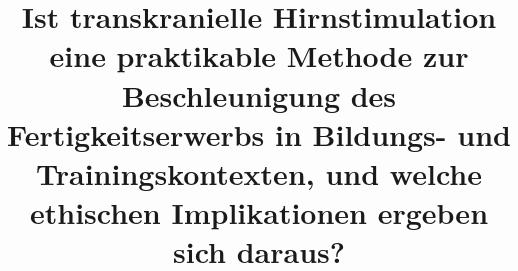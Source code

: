 
\newcommand{\waterMarkText}{}

\createdon{\today}

\title{Ist transkranielle Hirnstimulation eine praktikable Methode zur Beschleunigung des Fertigkeitserwerbs in Bildungs- und Trainingskontexten, und welche ethischen Implikationen ergeben sich daraus?}

\makeatletter
{}
\AddTitlePageDataSpace{3pt}
\AddTitlePageDataSpace{5pt}
\AddTitlePageDataSpace{5pt}
\AddTitlePageDataSpace{5pt}
\AddTitlePageDataSpace{5pt}
\makeatother

\newcommand{\titlepageabstract}{%
	Das Abstract beschreibt in wenigen Sätzen die Zielsetzung und das Ergebnis der Ausarbeitung. Das Abstract muss sich vollständig auf der Titelseite befinden. Die Zeichensatzformatierung wird in einem eigenen Absatz beschrieben  Das Abstract soll es den Lesern:innen ermöglichen, innerhalb von wenigen Augenblicken zu erfassen, welcher Inhalt hinter der Überschrift steckt und ob das Thema, aus Sicht der Leser:innen, zur weiteren Bearbeitung lohnt. Das Abstract ist keine verbale Beschreibung des Inhaltsverzeichnisses, sondern gibt kurz und knapp z.B. die Zielsetzung (z.B. Hypothese), die eingesetzten Methoden und die erzielten Ergebnisse / Erkenntnisse bekannt. Weitere Hinweise finden Sie außerdem im Vorlesungsskript.
}

\setlength{\parindent}{0pt}
